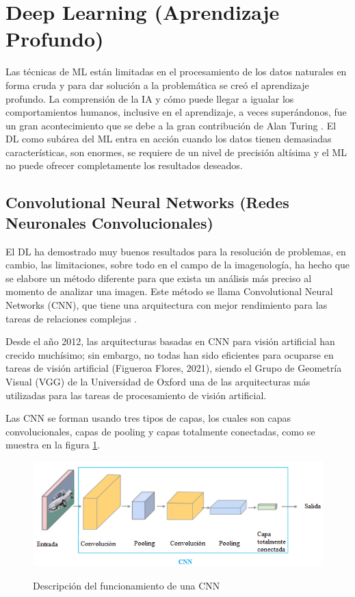 \doublespacing
\section{Deep Learning (Aprendizaje Profundo)}
Las técnicas de ML están limitadas en el procesamiento de los datos naturales en forma cruda y para dar solución a la problemática se creó el aprendizaje profundo. La comprensión de la IA y cómo puede llegar a igualar los comportamientos humanos, inclusive en el aprendizaje, a veces superándonos, fue un gran acontecimiento que se debe a la gran contribución de Alan Turing \cite{Carola}. El DL como subárea del ML entra en acción cuando los datos tienen demasiadas características, son enormes, se requiere de un nivel de precisión altísima y el ML no puede ofrecer completamente los resultados deseados.\\


\doublespacing
\subsection{Convolutional Neural Networks (Redes Neuronales Convolucionales)}
El DL ha demostrado muy buenos resultados para la resolución de problemas, en cambio, las limitaciones, sobre todo en el campo de la imagenología, ha hecho que se elabore un método diferente para que exista un análisis más preciso al momento de analizar una imagen. Este método se llama Convolutional Neural Networks (CNN), que tiene una arquitectura con mejor rendimiento para las tareas de relaciones complejas \cite{Pena-Torres}. \\
\par Desde el año 2012, las arquitecturas basadas en CNN para visión artificial han crecido muchísimo; sin embargo, no todas han sido eficientes para ocuparse en tareas de visión artificial (Figueroa Flores, 2021), siendo el Grupo de Geometría Visual (VGG) de la Universidad de Oxford \cite{Simonyan2015} una de las arquitecturas más utilizadas para las tareas de procesamiento de visión artificial. \\
\par Las CNN se forman usando tres tipos de capas, los cuales son capas convolucionales, capas de pooling y capas totalmente conectadas, como se muestra en la figura \ref{fig:CNN}.\\

\begin{figure}[H]
	\centering
	\includegraphics[scale=0.7]{img/Marco Teorico/convulcioinales.png}  
	\label{fig:CNN}
	\caption{Descripción del funcionamiento de una CNN}
\end{figure}

